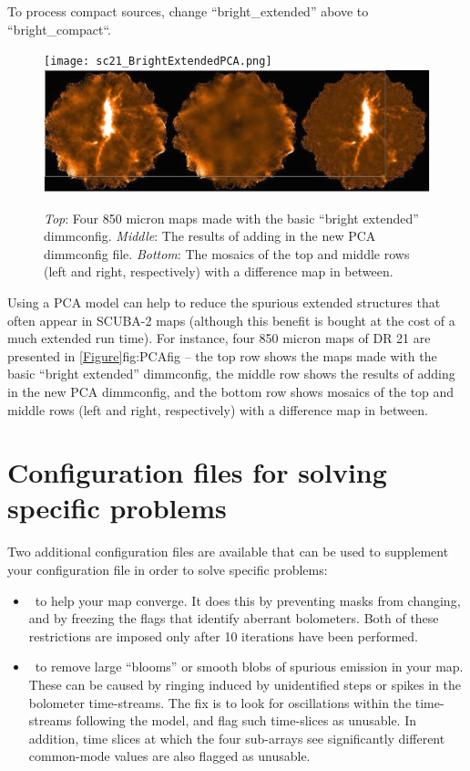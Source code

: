 To process compact sources, change “bright\_extended” above to “bright\_compact“.

\begin{figure}
\texttt{[image: sc21\_BrightExtendedPCA.png]}\\
\includegraphics[width=0.9\linewidth]{sc21_PCADifference.png}
\caption[PCA dimmconfig results]
   {\textit{Top}: Four 850 micron maps made with the basic ``bright extended'' dimmconfig. \textit{Middle}: The results of adding in the new PCA dimmconfig file. \textit{Bottom}: The mosaics of the top and middle rows (left and right, respectively) with a difference map in between.}
   \label{fig:PCAfig}
\end{figure}

Using a PCA model can help to reduce the spurious extended structures that often appear in SCUBA-2 maps (although this benefit is bought at the cost of a much extended run time). For instance, four 850 micron maps of DR 21 are presented in
\cref{Figure}{fig:PCAfig}{} – the top row shows the maps made with the basic “bright extended” dimmconfig, the middle row shows the results of adding in the new PCA dimmconfig, and the bottom row shows mosaics of the top and middle rows (left and right, respectively) with a difference map in between.

\section{Configuration files for solving specific problems}
\label{sec:problem}

Two additional configuration files are available that can be used to supplement your
configuration file in order to solve specific problems:

\begin{itemize}[noitemsep]

\item \fixconvergence\ to help your map converge. It does this by preventing masks
from changing, and by freezing the flags that identify aberrant bolometers. Both of
these restrictions are imposed only after 10 iterations have been performed.

\item \fixblobs\ to remove large ``blooms'' or smooth blobs of spurious emission
in your map. These can be caused by ringing induced by unidentified steps or
spikes in the bolometer time-streams. The fix is to look for oscillations
within the time-streams following the  model, and flag such
time-slices as unusable.  In addition, time slices at which the four sub-arrays
see significantly different common-mode values are also flagged as unusable.

\end{itemize}

